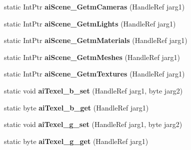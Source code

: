 \begin{DoxyCompactItemize}
\item 
\hypertarget{class_assimp_p_i_n_v_o_k_e_a55fcbbf2875cd7fe672a50b72c2f6ce9}{static Int\+Ptr {\bfseries ai\+Scene\+\_\+\+Getm\+Cameras} (Handle\+Ref jarg1)}\label{class_assimp_p_i_n_v_o_k_e_a55fcbbf2875cd7fe672a50b72c2f6ce9}

\item 
\hypertarget{class_assimp_p_i_n_v_o_k_e_afcbcf604dbf3cec733db68ddecfb69c4}{static Int\+Ptr {\bfseries ai\+Scene\+\_\+\+Getm\+Lights} (Handle\+Ref jarg1)}\label{class_assimp_p_i_n_v_o_k_e_afcbcf604dbf3cec733db68ddecfb69c4}

\item 
\hypertarget{class_assimp_p_i_n_v_o_k_e_ac29ee12aa1908d3da1376b83a7c9dd81}{static Int\+Ptr {\bfseries ai\+Scene\+\_\+\+Getm\+Materials} (Handle\+Ref jarg1)}\label{class_assimp_p_i_n_v_o_k_e_ac29ee12aa1908d3da1376b83a7c9dd81}

\item 
\hypertarget{class_assimp_p_i_n_v_o_k_e_a17462c03c8a49f2b3afeaafd80b4710a}{static Int\+Ptr {\bfseries ai\+Scene\+\_\+\+Getm\+Meshes} (Handle\+Ref jarg1)}\label{class_assimp_p_i_n_v_o_k_e_a17462c03c8a49f2b3afeaafd80b4710a}

\item 
\hypertarget{class_assimp_p_i_n_v_o_k_e_a7e86adecd086fe1d351af15328f55e4d}{static Int\+Ptr {\bfseries ai\+Scene\+\_\+\+Getm\+Textures} (Handle\+Ref jarg1)}\label{class_assimp_p_i_n_v_o_k_e_a7e86adecd086fe1d351af15328f55e4d}

\item 
\hypertarget{class_assimp_p_i_n_v_o_k_e_a0fde9a5cc1c9ea5790f91755270a372e}{static void {\bfseries ai\+Texel\+\_\+b\+\_\+set} (Handle\+Ref jarg1, byte jarg2)}\label{class_assimp_p_i_n_v_o_k_e_a0fde9a5cc1c9ea5790f91755270a372e}

\item 
\hypertarget{class_assimp_p_i_n_v_o_k_e_a39865a679dce6978207e9aef2713a667}{static byte {\bfseries ai\+Texel\+\_\+b\+\_\+get} (Handle\+Ref jarg1)}\label{class_assimp_p_i_n_v_o_k_e_a39865a679dce6978207e9aef2713a667}

\item 
\hypertarget{class_assimp_p_i_n_v_o_k_e_afaf1588a2d7d14b50e121bf6d34a4aa5}{static void {\bfseries ai\+Texel\+\_\+g\+\_\+set} (Handle\+Ref jarg1, byte jarg2)}\label{class_assimp_p_i_n_v_o_k_e_afaf1588a2d7d14b50e121bf6d34a4aa5}

\item 
\hypertarget{class_assimp_p_i_n_v_o_k_e_aa26e590667a0a4d0d13db53868fc8fac}{static byte {\bfseries ai\+Texel\+\_\+g\+\_\+get} (Handle\+Ref jarg1)}\label{class_assimp_p_i_n_v_o_k_e_aa26e590667a0a4d0d13db53868fc8fac}


\end{DoxyCompactItemize}
